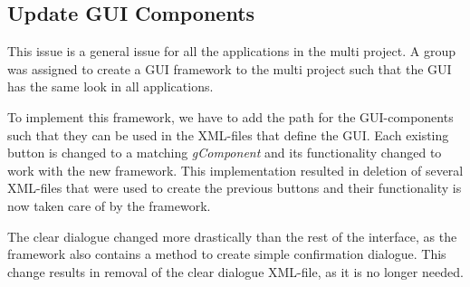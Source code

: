 \subsection{Update GUI Components}
This issue is a general issue for all the applications in the multi project. 
A group was assigned to create a GUI framework to the multi project such that the GUI has the same look in all applications.

To implement this framework, we have to add the path for the GUI-components such that they can be used in the XML-files that define the GUI.
Each existing button is changed to a matching \textit{gComponent} and its functionality changed to work with the new framework.
This implementation resulted in deletion of several XML-files that were used to create the previous buttons and their functionality is now taken care of by the framework.

The clear dialogue changed more drastically than the rest of the interface, as the framework also contains a method to create simple confirmation dialogue. 
This change results in removal of the clear dialogue XML-file, as it is no longer needed.